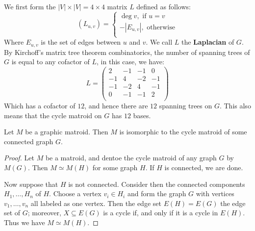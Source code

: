 \begin{example}
\begin{enumerate}
                We first form the $|V| \times |V|=4 \times 4$ matrix $L$ defined
                as follows:
                \begin{equation*}
                    (L_{u,v}) =\begin{cases}
                                    \deg{v}, \text{ if } u=v \\
                                    -|E_{u,v}|, \text{ otherwise} \\
                               \end{cases}
                \end{equation*}
                Where $E_{u,v}$ is the set of edges between $u$ and  $v$. We call
                $L$ the  \textbf{Laplacian} of $G$. By Kirchoff's matrix tree
                theorem combinatorics, the number of spanning trees of $G$ is
                equal to any cofactor of  $L$, in this case, we have:
                \begin{equation*}
                    L=\begin{pmatrix}
                        2   &   -1  &   -1  &   0   \\
                       -1   &    4  &   -2  &  -1   \\
                       -1   &   -2  &    4  &  -1   \\
                        0   &   -1  &   -1  &   2   \\
                      \end{pmatrix}
                \end{equation*}
                Which has a cofactor of $12$, and hence there are $12$ spanning
                trees on  $G$. This also means that the cycle matroid on $G$ has
                 $12$ bases.
    \end{enumerate}
\end{example}

\begin{theorem}\label{1.2.5}
    Let $M$ be a graphic matroid. Then $M$ is isomorphic to the cycle matroid of
    some connected graph $G$.
\end{theorem}
\begin{proof}
    Let $M$ be a matroid, and dentoe the cycle matroid of any graph $G$ by
    $M(G)$. Then $M \simeq M(H)$ for some graph $H$. If  $H$ is connected, we
    are done.

    Now suppose that  $H$ is not connected. Consider then the connected
    components  $H_1, \dots, H_n$ of $H$. Choose a vertex  $v_i \in H_i$ and
    form the graph  $G$ with vertices  $v_1, \dots, v_n$ all labeled as one
    vertex. Then the edge set $E(H)=E(G)$ the edge set of $G$; moreover, $X
    \subseteq E(G)$ is a cycle if, and only if it is a cycle in $E(H)$. Thus we
    have $M \simeq M(H)$.
\end{proof}

